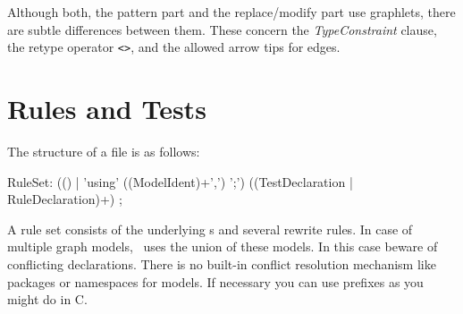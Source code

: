 \begin{figure}[htbp]
\end{figure}

\begin{note}
	Although both, the pattern part and the replace/modify part use graphlets, there are subtle differences between them. 
	These concern the \emph{TypeConstraint} clause, the retype operator \texttt{<>}, and the allowed arrow tips for edges.
\end{note}

\section{Rules and Tests}
\label{ruledecls}
The structure of a  file is as follows:
\begin{rail}
  RuleSet: (() | 'using' ((ModelIdent)+',') ';') ((TestDeclaration | RuleDeclaration)+) ;
\end{rail}
A rule set consists of the underlying s and several rewrite rules. In case of multiple graph models, \GrG\ uses the union of these models. In this case beware of conflicting declarations. There is no built-in conflict resolution mechanism like packages or namespaces for models. If necessary you can use prefixes as you might do in C.

